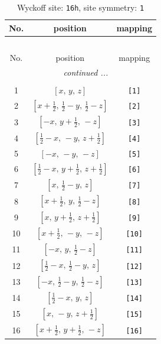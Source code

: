 \documentclass[fleqn,8pt]{jsarticle}
\begin{document}
\begin{longtable}{ccc}
\caption{Wyckoff site: {\tt 16h}, site symmetry: {\tt 1}}
 \\
 \hline \hline
No. & position & mapping \\ \hline \endfirsthead

\multicolumn{2}{l}{\tablename\ \thetable{}} \\
 \hline \hline
No. & position & mapping \\ \hline \endhead

 \hline \hline
\multicolumn{2}{r}{\footnotesize\it continued ...} \\ \endfoot

 \hline \hline
\multicolumn{2}{r}{} \\ \endlastfoot

1 & $\left[ x,\, y,\, z \right]$ & {\tt [1]} \\ \hline
2 & $\left[ x + \frac{1}{2},\, \frac{1}{2} - y,\, \frac{1}{2} - z \right]$ & {\tt [2]} \\ \hline
3 & $\left[ - x,\, y + \frac{1}{2},\, - z \right]$ & {\tt [3]} \\ \hline
4 & $\left[ \frac{1}{2} - x,\, - y,\, z + \frac{1}{2} \right]$ & {\tt [4]} \\ \hline
5 & $\left[ - x,\, - y,\, - z \right]$ & {\tt [5]} \\ \hline
6 & $\left[ \frac{1}{2} - x,\, y + \frac{1}{2},\, z + \frac{1}{2} \right]$ & {\tt [6]} \\ \hline
7 & $\left[ x,\, \frac{1}{2} - y,\, z \right]$ & {\tt [7]} \\ \hline
8 & $\left[ x + \frac{1}{2},\, y,\, \frac{1}{2} - z \right]$ & {\tt [8]} \\ \hline
9 & $\left[ x,\, y + \frac{1}{2},\, z + \frac{1}{2} \right]$ & {\tt [9]} \\ \hline
10 & $\left[ x + \frac{1}{2},\, - y,\, - z \right]$ & {\tt [10]} \\ \hline
11 & $\left[ - x,\, y,\, \frac{1}{2} - z \right]$ & {\tt [11]} \\ \hline
12 & $\left[ \frac{1}{2} - x,\, \frac{1}{2} - y,\, z \right]$ & {\tt [12]} \\ \hline
13 & $\left[ - x,\, \frac{1}{2} - y,\, \frac{1}{2} - z \right]$ & {\tt [13]} \\ \hline
14 & $\left[ \frac{1}{2} - x,\, y,\, z \right]$ & {\tt [14]} \\ \hline
15 & $\left[ x,\, - y,\, z + \frac{1}{2} \right]$ & {\tt [15]} \\ \hline
16 & $\left[ x + \frac{1}{2},\, y + \frac{1}{2},\, - z \right]$ & {\tt [16]} \\
\end{longtable}
\end{document}
